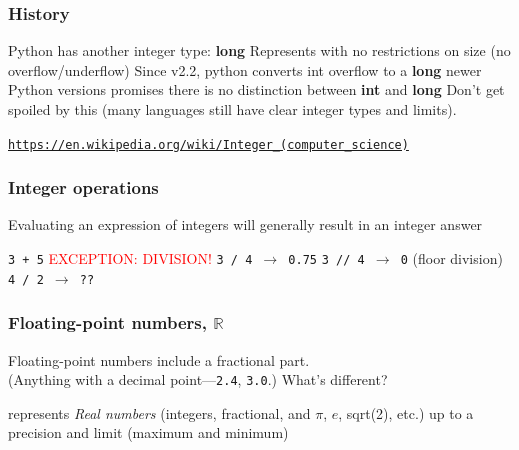 \documentclass[11pt]{beamer}
\begin{document}
\begin{frame}
  \frametitle{History}
  \Enlarge

  \begin{itemize}
  \myitem Python has another integer type: {\bf long} 
  \myitem Represents with no restrictions on size (no overflow/underflow) \pause
  \myitem Since v2.2, python converts int overflow to a {\bf long} \pause
  \myitem newer Python versions promises there is no distinction between {\bf int} and {\bf long} \pause
  \myitem Don't get spoiled by this (many languages still have clear integer types and limits).
  \end{itemize}
  
  \textcolor{blue}{\small \texttt{\url{https://en.wikipedia.org/wiki/Integer_(computer_science)}}} 
  
\end{frame}


\begin{frame}
  \frametitle{Integer operations}
  \Enlarge

  \begin{itemize}
  \myitem  Evaluating an expression of integers will generally result in an integer answer
    \begin{itemize}
    \mysubitem  \texttt{3 + 5} \pause
    \mysubitem  \textcolor{red}{EXCEPTION:  DIVISION!} \pause
    \mysubitem  \texttt{3 / 4 $\rightarrow$ 0.75} \pause
    \mysubitem  \texttt{3 // 4 $\rightarrow$ 0} (floor division)\pause
    \mysubitem  \texttt{4 / 2 $\rightarrow$ ??}
    \end{itemize}
  \end{itemize}
\end{frame}

\begin{frame}
  \frametitle{Floating-point numbers, $\mathbb{R}$}
  \Enlarge

  \begin{itemize}
  \myitem  Floating-point numbers include a fractional part. \\
    \textcolor{CS101GradBot}{(Anything with a decimal point---\texttt{2.4}, \texttt{3.0}.)} \pause
  \myitem  What's different? \pause
    \begin{itemize}
    \mysubitem  represents \emph{Real numbers} (integers, fractional, and $\pi$, $e$, sqrt(2), etc.) \pause
    \mysubitem  up to a precision and limit (maximum and minimum)
    \end{itemize}
  \end{itemize}
\end{frame}
\end{document}
